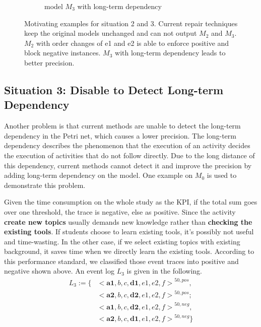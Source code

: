 \begin{figure}[htp]
\begin{subfigure}[b]{0.5\textwidth}
		\caption{model $M_{3}$ with long-term dependency}
		\label{fig:demo_s3_expected}
	\end{subfigure}
	\caption[Motivating examples for situation 2 and 3]{Motivating examples for situation 2 and 3. Current repair techniques keep the original models unchanged and can not output $M_{2}$ and $M_{3}$. $M_2$ with order changes of e1 and e2 is able to enforce positive and block negative instances. $M_{3}$ with long-term dependency leads to better precision.}
	\label{fig:model_demo_2_3}
\end{figure}
\subsection{Situation 3: \small{Disable to Detect Long-term Dependency}}
Another problem is that current methods are unable to detect the long-term dependency in the Petri net, which causes a lower precision. The long-term dependency describes the phenomenon that the execution of an activity decides the execution of activities that do not follow directly. Due to the long distance of this dependency, current methods cannot detect it and improve the precision by adding long-term dependency on the model. One example  on $M_0$ is used to demonstrate this problem.
 

Given the time consumption on the whole study as the KPI, if the total sum goes over one threshold, the trace is negative, else as positive. Since the activity \textbf{create new topics} usually demands new knowledge rather than \textbf{checking the existing tools}. If students choose to learn existing tools, it's possibly not useful and time-wasting. In the other case, if we select existing topics with existing background, it saves time when we directly learn the existing tools. According to this performance standard, we classified those event traces into positive and negative shown above.
An event log $L_3$ is given in the following. 
\begin{align*}
L_3:= \{ & { <\textbf{a1}, b, c, \textbf{d1}, e1, e2, f >}^{50, pos}, \\  
 &{<\textbf{a2}, b, c, \textbf{d2}, e1, e2, f >}^{50, pos} ; \\
& {<\textbf{a1}, b, c, \textbf{d2}, e1, e2, f >}^{50, neg}, \\
& {<\textbf{a2}, b, c, \textbf{d1}, e1, e2, f >}^{50, neg}  \}
\end{align*}

